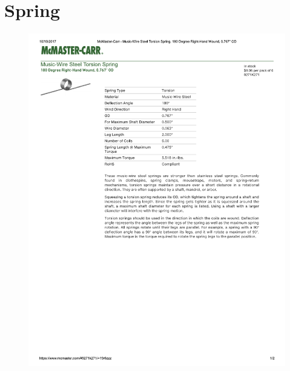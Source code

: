 \documentclass[../main.tex]{subfiles}
\begin{document}
\section{Spring \cite{TorsionSpring}} \label{TorsionSpring}
\begin{figure}[H]
	\centering
	\includegraphics[width=\textwidth]{img/specs/Torsion-Spring.pdf}
\end{figure}

\end{document}
